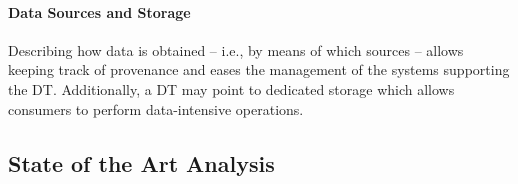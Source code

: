 \paragraph{Data Sources and Storage}
Describing how data is obtained -- i.e., by means of which sources -- allows keeping track of provenance and eases the management of the systems supporting the DT. Additionally, a DT may point to dedicated storage which allows consumers to perform data-intensive operations.
%

\subsection{State of the Art Analysis}


